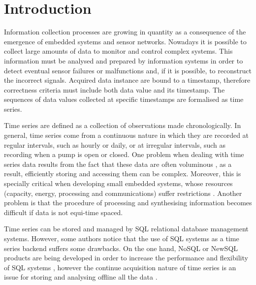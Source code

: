 


\section{Introduction}



Information collection processes are growing in quantity as a
consequence of the emergence of embedded systems and sensor networks.
Nowadays it is possible to collect large amounts of data to monitor
and control complex systems.  This information must be analysed and
prepared by information systems in order to detect eventual sensor
failures or malfunctions and, if it is possible, to reconstruct the
incorrect signals. Acquired data instance are bound to a timestamp,
therefore correctness criteria must include both data value and its
timestamp. The sequences of data values collected at specific
timestamps are formalised as time series.


Time series are defined as a collection of observations made
chronologically.  In general, time series come from a continuous
nature in which they are recorded at regular intervals, such as hourly
or daily, or at irregular intervals, such as recording when a pump is
open or closed.  One problem when dealing with time series data
results from the fact that these data are often voluminous
\cite{fu11,keogh08:isax}, as a result, efficiently storing and
accessing them can be complex. Moreover, this is specially critical
when developing small embedded systems, whose resources (capacity,
energy, processing and communications) suffer restrictions
\cite{yaogehrke02}.  Another problem is that the procedure of
processing and synthesising information becomes difficult if data is
not equi-time spaced.



Time series can be stored and managed by SQL relational database
management systems. However, some authors
\cite{dreyer94,schmidt95,stonebraker09:scidb,zhang11} notice that the
use of SQL systems as a time series backend suffers some drawbacks.
On the one hand, NoSQL or NewSQL products are being developed in order
to increase the performance and flexibility of SQL systems
\cite{atzeni13:relational_model_dead,stonebraker10,stonebraker09:scidb,zhang11},
however the continue acquisition nature of time series is an issue for
storing and analysing offline all the data \cite{keogh97}.

